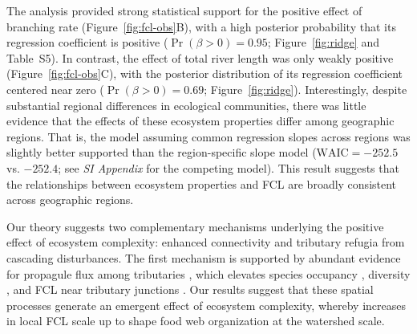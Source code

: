 \documentclass[9pt,twocolumn,twoside]{pnas-new}
\begin{document}
The analysis provided strong statistical support for the positive effect of branching rate (Figure~\ref{fig:fcl-obs}B), with a high posterior probability that its regression coefficient is positive ($\Pr(\beta > 0) = 0.95$; Figure~\ref{fig:ridge} and Table~S5). 
In contrast, the effect of total river length was only weakly positive (Figure~\ref{fig:fcl-obs}C), with the posterior distribution of its regression coefficient centered near zero ($\Pr(\beta > 0) = 0.69$; Figure~\ref{fig:ridge}).
Interestingly, despite substantial regional differences in ecological communities, there was little evidence that the effects of these ecosystem properties differ among geographic regions. 
That is, the model assuming common regression slopes across regions was slightly better supported than the region-specific slope model ($\text{WAIC} = -252.5$ vs. $-252.4$; see \textit{SI Appendix} for the competing model). 
This result suggests that the relationships between ecosystem properties and FCL are broadly consistent across geographic regions.

Our theory suggests two complementary mechanisms underlying the positive effect of ecosystem complexity: enhanced connectivity and tributary refugia from cascading disturbances.
The first mechanism is supported by abundant evidence for propagule flux among tributaries \citep{grant_living_2007, grant_use_2010, terui_dispersal_2014, uno_mainstemtributary_2015, tsuboi_small_2022, uno_bridging_2026}, which elevates species occupancy \citep{terui_asymmetric_2014, wahl_approximation_2024}, diversity \citep{uno_bridging_2026}, and FCL near tributary junctions \citep{sullivan_ecosystem_2015, sabo_pulsed_2018}.
Our results suggest that these spatial processes generate an emergent effect of ecosystem complexity, whereby increases in local FCL scale up to shape food web organization at the watershed scale.
\end{document}
